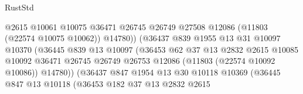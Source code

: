 \begin{lexlean}{RustStd}
\begin{coremodule}
                                          @2615
                                          @10061
                                          @10075
                                          @36471
                                          @26745
                                          @26749
                                          @27508
                                          @12086
                                          (@11803 (@22574 @10075 @10062))
                                          @14780))
                                      (@36437
                                        @839
                                        @1955
                                        @13
                                        @31
                                        @10097
                                        @10370
                                        (@36445
                                          @839
                                          @13
                                          @10097
                                          (@36453
                                            @62
                                            @37
                                            @13
                                            @2832
                                            @2615
                                            @10085
                                            @10092
                                            @36471
                                            @26745
                                            @26749
                                            @26753
                                            @12086
                                            (@11803 (@22574 @10092 @10086))
                                            @14780))
                                        (@36437
                                          @847
                                          @1954
                                          @13
                                          @30
                                          @10118
                                          @10369
                                          (@36445
                                            @847
                                            @13
                                            @10118
                                            (@36453
                                              @182
                                              @37
                                              @13
                                              @2832
                                              @2615

\end{coremodule}
\end{lexlean}
